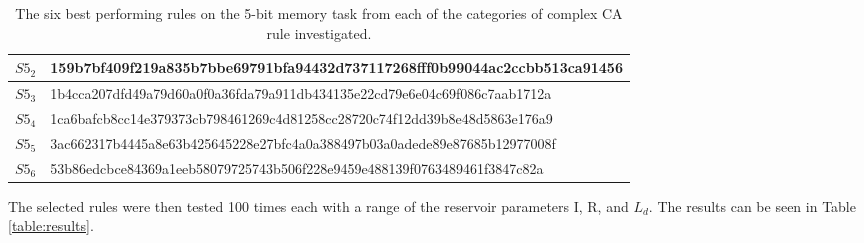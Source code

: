 \documentclass{elsarticle}
\begin{document}
\begin{multicols}{2}
\begin{table}[!htb]
\begin{tabular}{|p{2cm}|l|}
    \\
    \hline
    $S5_{2}$ & %
159b7bf409f219a835b7bbe69791bfa94432d737117268fff0b99044ac2ccbb513ca91456 \\
\hline
$S5_{3}$ & %
1b4cca207dfd49a79d60a0f0a36fda79a911db434135e22cd79e6e04c69f086c7aab1712a
\\ \hline
$S5_{4}$  & %
1ca6bafcb8cc14e379373cb798461269c4d81258cc28720c74f12dd39b8e48d5863e176a9
\\ \hline
$S5_{5}$ & %
3ac662317b4445a8e63b425645228e27bfc4a0a388497b03a0adede89e87685b12977008f
\\ \hline
$S5_{6}$ & %
53b86edcbce84369a1eeb58079725743b506f228e9459e488139f0763489461f3847c82a
\\ \hline
\end{tabular}
\caption{The six best performing rules on the 5-bit memory task from each of 
   the categories of complex CA rule investigated.}
\label{table:rules}
\end{table}


The selected rules were then tested 100 times each with a range of the 
reservoir parameters I, R, and $L_{d}$.  The results can be seen in Table 
\ref{table:results}. 


\end{multicols}
\end{document}
